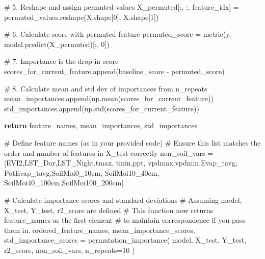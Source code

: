 \documentclass[
  letterpaper,
  DIV=11,
  numbers=noendperiod]{scrreprt}
\newenvironment{Shaded}{\begin{snugshade}}{\end{snugshade}}
\newcommand{\CommentTok}[1]{\textcolor[rgb]{0.37,0.37,0.37}{#1}}
\newcommand{\ControlFlowTok}[1]{\textcolor[rgb]{0.00,0.23,0.31}{\textbf{#1}}}
\newcommand{\DecValTok}[1]{\textcolor[rgb]{0.68,0.00,0.00}{#1}}
\newcommand{\NormalTok}[1]{\textcolor[rgb]{0.00,0.23,0.31}{#1}}
\newcommand{\OperatorTok}[1]{\textcolor[rgb]{0.37,0.37,0.37}{#1}}
\newcommand{\StringTok}[1]{\textcolor[rgb]{0.13,0.47,0.30}{#1}}
\begin{document}
\begin{Shaded}
\begin{Highlighting}[]
            \CommentTok{\# 5. Reshape and assign permuted values}
\NormalTok{            X\_permuted[:, :, feature\_idx] }\OperatorTok{=}\NormalTok{ permuted\_values.reshape(X.shape[}\DecValTok{0}\NormalTok{], X.shape[}\DecValTok{1}\NormalTok{])}

            \CommentTok{\# 6. Calculate score with permuted feature}
\NormalTok{            permuted\_score }\OperatorTok{=}\NormalTok{ metric(y, model.predict(X\_permuted)[:, }\DecValTok{0}\NormalTok{])}

            \CommentTok{\# 7. Importance is the drop in score}
\NormalTok{            scores\_for\_current\_feature.append(baseline\_score }\OperatorTok{{-}}\NormalTok{ permuted\_score)}

        \CommentTok{\# 8. Calculate mean and std dev of importances from n\_repeats}
\NormalTok{        mean\_importances.append(np.mean(scores\_for\_current\_feature))}
\NormalTok{        std\_importances.append(np.std(scores\_for\_current\_feature))}

    \ControlFlowTok{return}\NormalTok{ feature\_names, mean\_importances, std\_importances}

\CommentTok{\# Define feature names (as in your provided code)}
\CommentTok{\# Ensure this list matches the order and number of features in X\_test correctly}
\NormalTok{non\_soil\_vars }\OperatorTok{=}\NormalTok{ [}\StringTok{\textquotesingle{}EVI2\textquotesingle{}}\NormalTok{,}\StringTok{\textquotesingle{}LST\_Day\textquotesingle{}}\NormalTok{,}\StringTok{\textquotesingle{}LST\_Night\textquotesingle{}}\NormalTok{,}\StringTok{\textquotesingle{}tmax\textquotesingle{}}\NormalTok{,}
                 \StringTok{\textquotesingle{}tmin\textquotesingle{}}\NormalTok{,}\StringTok{\textquotesingle{}ppt\textquotesingle{}}\NormalTok{, }\StringTok{\textquotesingle{}vpdmax\textquotesingle{}}\NormalTok{,}\StringTok{\textquotesingle{}vpdmin\textquotesingle{}}\NormalTok{,}\StringTok{\textquotesingle{}Evap\_tavg\textquotesingle{}}\NormalTok{,}
                 \StringTok{\textquotesingle{}PotEvap\_tavg\textquotesingle{}}\NormalTok{,}\StringTok{\textquotesingle{}SoilMoi0\_10cm\textquotesingle{}}\NormalTok{, }\StringTok{\textquotesingle{}SoilMoi10\_40cm\textquotesingle{}}\NormalTok{,}
                 \StringTok{\textquotesingle{}SoilMoi40\_100cm\textquotesingle{}}\NormalTok{,}\StringTok{\textquotesingle{}SoilMoi100\_200cm\textquotesingle{}}\NormalTok{]}

\CommentTok{\# Calculate importance scores and standard deviations}
\CommentTok{\# Assuming \textquotesingle{}model\textquotesingle{}, \textquotesingle{}X\_test\textquotesingle{}, \textquotesingle{}Y\_test\textquotesingle{}, \textquotesingle{}r2\_score\textquotesingle{} are defined}
\CommentTok{\# This function now returns feature\_names as the first element}
\CommentTok{\# to maintain correspondence if you pass them in.}
\NormalTok{ordered\_feature\_names, mean\_importance\_scores, std\_importance\_scores }\OperatorTok{=}\NormalTok{ permutation\_importance(}
\NormalTok{    model, X\_test, Y\_test, r2\_score, non\_soil\_vars, n\_repeats}\OperatorTok{=}\DecValTok{10}
\NormalTok{)}


\end{Highlighting}
\end{Shaded}
\end{document}
